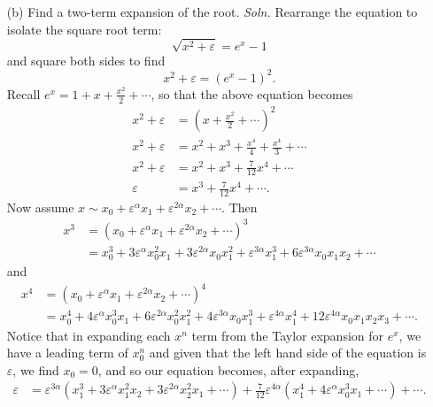 \documentclass{article}
\begin{document}
\begin{itemize}
\begin{itemize}
        \item[(b)] Find a two-term expansion of the root.
        \newline\newline
        \textit{Soln.} Rearrange the equation to isolate the square root term:
        \[\sqrt{x^2 + \varepsilon} = e^x - 1\]
        and square both sides to find
        \[x^2 + \varepsilon = \left(e^x - 1\right)^2.\]
        Recall $e^x = 1 + x + \frac{x^2}{2} + \cdots$, so that the above equation becomes
        \begin{align*}
            x^2 + \varepsilon &= \left(x + \frac{x^2}{2} + \cdots\right)^2\\
            x^2 + \varepsilon &= x^2 + x^3 + \frac{x^4}{4} + \frac{x^4}{3} + \cdots\\
            x^2 + \varepsilon &= x^2 + x^3 + \frac{7}{12}x^4 + \cdots\\
            \varepsilon &= x^3 + \frac{7}{12}x^4 + \cdots.
        \end{align*}
        Now assume $x \sim x_0 + \varepsilon^{\alpha}x_1 + \varepsilon^{2\alpha}x_2 + \cdots$. Then 
        \begin{align*}
            x^3 &= (x_0 + \varepsilon^{\alpha}x_1 + \varepsilon^{2\alpha}x_2 + \cdots)^3\\
            &= x_0^3 + 3\varepsilon^{\alpha}x_0^2x_1 + 3\varepsilon^{2\alpha}x_0x_1^2 + \varepsilon^{3\alpha}x_1^3 + 6\varepsilon^{3\alpha}x_0x_1x_2 + \cdots
        \end{align*}
        and
        \begin{align*}
            x^4 &= (x_0 + \varepsilon^{\alpha}x_1 + \varepsilon^{2\alpha}x_2 + \cdots)^4\\
            &= x_0^4 + 4\varepsilon^{\alpha}x_0^3x_1 + 6\varepsilon^{2\alpha}x_0^2x_1^2 + 4\varepsilon^{3\alpha}x_0x_1^3 + \varepsilon^{4\alpha}x_1^4 + 12\varepsilon^{4\alpha}x_0x_1x_2x_3 + \cdots.
        \end{align*}
        Notice that in expanding each $x^n$ term from the Taylor expansion for $e^x$, we have a leading term of $x_0^n$ and given that the left hand side of the equation is $\varepsilon$, we find $x_0 = 0$, and so our equation becomes, after expanding,
        \begin{align*}
            \varepsilon &= \varepsilon^{3\alpha}\left(x_1^3 + 3\varepsilon^{\alpha}x_1^2x_2 + 3\varepsilon^{2\alpha}x_2^2x_1 + \cdots\right) + \frac{7}{12}\varepsilon^{4\alpha}\left(x_1^4 + 4\varepsilon^{\alpha}x_0^3x_1 + \cdots \right) + \cdots.
        \end{align*}

\end{itemize}
\end{itemize}
\end{document}
